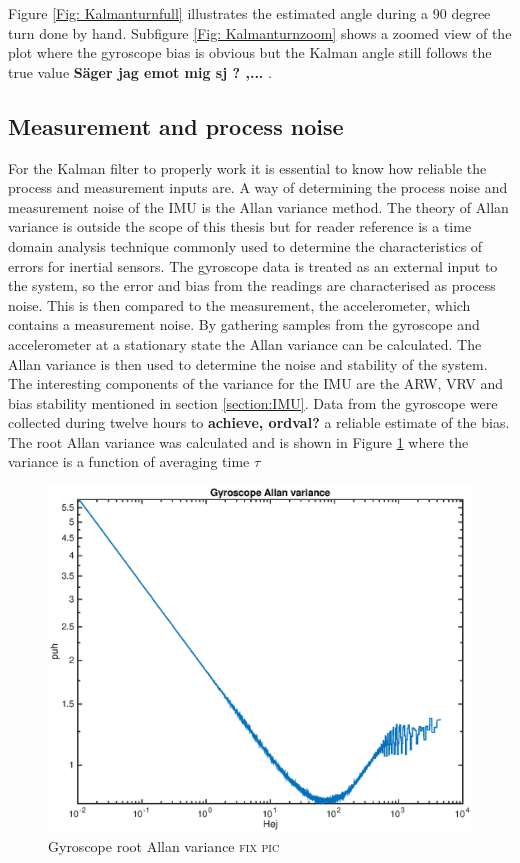 \documentclass[a4paper,11pt]{kth-mag}
\begin{document}
Figure \ref{Fig: Kalmanturnfull} illustrates the estimated angle during a 90 degree turn done by hand. Subfigure \ref{Fig: Kalmanturnzoom} shows a zoomed view of the plot where the gyroscope bias is obvious but the Kalman angle still follows the true value \textbf{Säger jag emot mig sj ? ,...} .



\subsection{Measurement and process noise} \label{chapter:Allan Variance}
For the Kalman filter to properly work it is essential to know how reliable the process and measurement inputs are.  A way of determining the process noise and measurement noise of the IMU is the Allan variance method. The theory of Allan variance is outside the scope of this thesis but for reader reference is a time domain analysis technique commonly used to determine the characteristics of errors for inertial sensors\cite{Allancalibration}.
The gyroscope data is treated as an external input to the system, so the error and bias from the readings are characterised as process noise. This is then compared to the measurement, the accelerometer, which contains a measurement noise.
By gathering samples from the gyroscope and accelerometer at a stationary state the Allan variance can be calculated. The Allan variance is then used to determine the noise and stability of the system. The interesting components of the variance for the IMU are the ARW, VRV and bias stability mentioned in section \ref{section:IMU}.
Data from the gyroscope were collected during twelve hours to \textbf{achieve, ordval?} a reliable estimate of the bias. 
The root Allan variance was calculated and is shown in Figure \ref{fig:gyroscope allan} where the variance is a function of averaging time $\tau$

\begin{figure}[!htb]
\centering
\includegraphics[scale=.6]{gyroscopeallan.eps}
\caption{Gyroscope root Allan variance \textsc{fix pic}}
\label{fig:gyroscope allan}
\end{figure}
\end{document}
